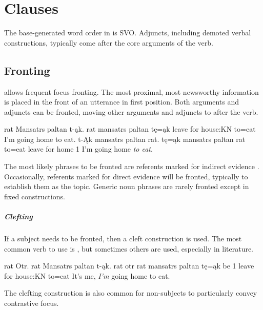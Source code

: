 \setchapterpreamble[u]{\margintoc}
\chapter{Clauses}
The base-generated word order in \langname{} is SVO. Adjuncts, including demoted verbal constructions, typically come after the core arguments of the verb.

\section{Fronting} \label{sec:fronting}
\langname{} allows frequent focus fronting. The most proximal, most newsworthy information is placed in the front of an utterance in first position. Both arguments and adjuncts can be fronted, moving other arguments and adjuncts to after the verb. 

\begin{subexamples}
    \ex
        \script rat Mansatrs paltan t-ąk.
        \bits rat mansatrs paltan tę=ąk
         {leave for} house:KN to=eat
        \tr I'm going home to eat.
    \ex
        \script t-Ąk mansatrs paltan rat.
        \bits tę=ąk mansatrs paltan rat
        \gloss to=eat {leave for} home 1
        \tr I'm going home \emph{to eat}.
\end{subexamples}

The most likely phrases to be fronted are referents marked for indirect evidence . Occasionally, referents marked for direct evidence will be fronted, typically to establish them as the topic. Generic noun phrases are rarely fronted except in fixed constructions.

\paragraph{Clefting}
If a subject needs to be fronted, then a cleft construction is used. The most common verb to use is , but sometimes others are used, especially in literature.

\begin{example}
    \script rat Otr. rat Mansatrs paltan t-ąk.
    \bits rat otr rat mansatrs paltan tę=ąk
     be 1 {leave for} house:KN to=eat
    \tr It's me, \emph{I'm} going home to eat.
\end{example}

The clefting construction is also common for non-subjects to particularly convey contrastive focus.

